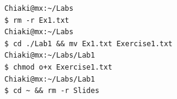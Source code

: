 \documentclass{article}
\begin{document}
\begin{verbatim}
  Chiaki@mx:~/Labs                                                                                                                                                                                               
  $ rm -r Ex1.txt                                                                                                                                                                                                
  Chiaki@mx:~/Labs                                                                                                                                                                                               
  $ cd ./Lab1 && mv Ex1.txt Exercise1.txt                                                                                                                                                                        
  Chiaki@mx:~/Labs/Lab1                                                                                                                                                                                          
  $ chmod o+x Exercise1.txt                                                                                                                                                                                      
  Chiaki@mx:~/Labs/Lab1                                                                                                                                                                                          
  $ cd ~ && rm -r Slides
\end{verbatim}
\end{document}
